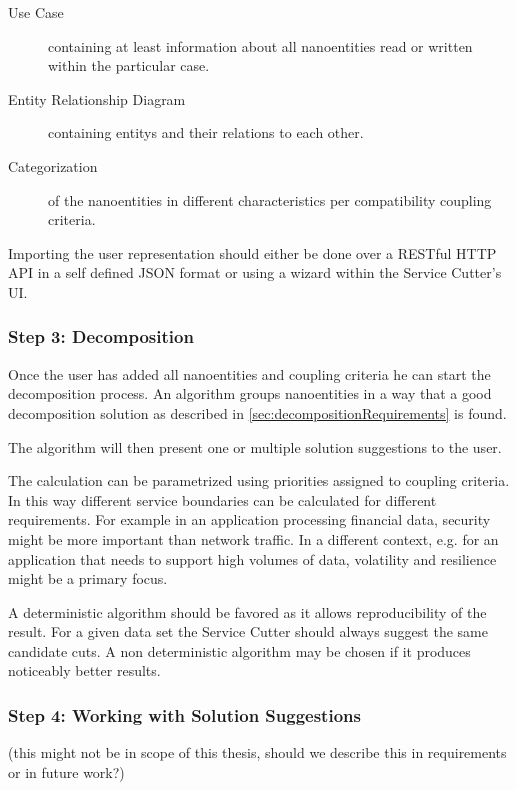 \begin{description}
	\item[Use Case] containing at least information about all nanoentities read or written within the particular case. 
		\item[Entity Relationship Diagram] containing \glspl{entity} and their relations to each other. 
	\item[Categorization] of the nanoentities in different characteristics per compatibility coupling criteria. 
\end{description}

Importing the user representation should either be done over a RESTful HTTP API in a self defined JSON format or using a wizard within the Service Cutter's \gls{UI}.

\subsubsection{Step 3: Decomposition}

Once the user has added all nanoentities and coupling criteria he can start the decomposition process. An algorithm groups nanoentities in a way that a good decomposition solution as described in \ref{sec:decompositionRequirements} is found. 

The algorithm will then present one or multiple solution suggestions to the user.

The calculation can be parametrized using priorities assigned to coupling criteria. In this way different service boundaries can be calculated for different requirements. For example in an application processing financial data, security might be more important than network traffic. In a different context, e.g. for an application that needs to support high volumes of data, volatility and resilience might be a primary focus.

A deterministic algorithm should be favored as it allows reproducibility of the result. For a given data set the Service Cutter should always suggest the same candidate cuts. A non deterministic algorithm may be chosen if it produces noticeably better results.

\subsubsection{Step 4: Working with Solution Suggestions}

(this might not be in scope of this thesis, should we describe this in requirements or in future work?)

